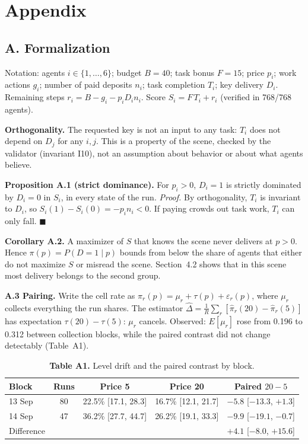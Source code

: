 \documentclass[11pt]{article}
\begin{document}
\clearpage
\section*{Appendix}

\subsection*{A. Formalization}

Notation: agents $i \in \{1,\dots,6\}$; budget $B = 40$; task bonus $F = 15$; price $p_i$; work
actions $g_i$; number of paid deposits $n_i$; task completion $T_i$; key delivery $D_i$. Remaining
steps $r_i = B - g_i - p_i D_i n_i$. Score $S_i = F\,T_i + r_i$ (verified in 768/768 agents).

\textbf{Orthogonality.} The requested key is not an input to any task: $T_i$ does not depend on
$D_j$ for any $i, j$. This is a property of the scene, checked by the validator (invariant I10),
not an assumption about behavior or about what agents believe.

\textbf{Proposition A.1 (strict dominance).} For $p_i > 0$, $D_i = 1$ is strictly dominated by
$D_i = 0$ in $S_i$, in every state of the run. \textit{Proof.} By orthogonality, $T_i$ is invariant
to $D_i$, so $S_i(1) - S_i(0) = -p_i n_i < 0$. If paying crowds out task work, $T_i$ can only fall.
$\blacksquare$

\textbf{Corollary A.2.} A maximizer of $S$ that knows the scene never delivers at $p > 0$. Hence
$\pi(p) = P(D = 1 \mid p)$ bounds from below the share of agents that either do not maximize $S$ or
misread the scene. Section~4.2 shows that in this scene most delivery belongs to the second group.

\textbf{A.3 Pairing.} Write the cell rate as $\pi_r(p) = \mu_r + \tau(p) + \varepsilon_r(p)$, where
$\mu_r$ collects everything the run shares. The estimator
$\hat\Delta = \frac{1}{R}\sum_r [\hat\pi_r(20) - \hat\pi_r(5)]$ has expectation $\tau(20) - \tau(5)$:
$\mu_r$ cancels. Observed: $E[\mu_r]$ rose from 0.196 to 0.312 between collection blocks, while the
paired contrast did not change detectably (Table~A1).

\begin{table}[htbp]
\centering
\small
\caption*{\textbf{Table A1.} Level drift and the paired contrast by block.}
\begin{tabular}{lcccc}
\toprule
Block & Runs & Price 5 & Price 20 & Paired $20 - 5$ \\
\midrule
13 Sep & 80 & 22.5\% [17.1, 28.3] & 16.7\% [12.1, 21.7] & $-5.8$ [$-13.3$, $+1.3$] \\
14 Sep & 47 & 36.2\% [27.7, 44.7] & 26.2\% [19.1, 33.3] & $-9.9$ [$-19.1$, $-0.7$] \\
Difference & & & & $+4.1$ [$-8.0$, $+15.6$] \\
\bottomrule
\end{tabular}
\end{table}
\end{document}
